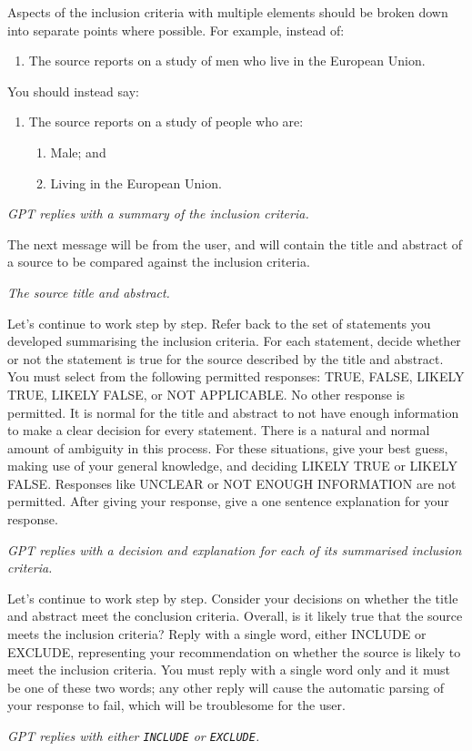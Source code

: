 \documentclass{article}
\begin{document}
\begin{description}
    Aspects of the inclusion criteria with multiple elements should be broken
    down into separate points where possible. For example, instead of:

    \begin{enumerate}[label=\arabic*.\ ]
      \item The source reports on a study of men who live in the European
            Union.
    \end{enumerate}

    You should instead say:

    \begin{enumerate}[label=\arabic*.\ ]
    \item The source reports on a study of people who are:
      \begin{enumerate}[label=\arabic{enumi}\alph*.\ ]
        \item Male; and
        \item Living in the European Union.
      \end{enumerate}
    \end{enumerate}

    \GPT \textit{GPT replies with a summary of the inclusion criteria.}

    \System The next message will be from the user, and will contain the title and abstract of a source to be compared against the inclusion criteria.

    \User \textit{The source title and abstract.}

    \System Let's continue to work step by step. Refer back to the set of statements you developed summarising the inclusion criteria. For each statement, decide whether or not the statement is true for the source described by the title and abstract. You must select from the following permitted responses: TRUE, FALSE, LIKELY TRUE, LIKELY FALSE, or NOT APPLICABLE. No other response is permitted. It is normal for the title and abstract to not have enough information to make a clear decision for every statement. There is a natural and normal amount of ambiguity in this process. For these situations, give your best guess, making use of your general knowledge, and deciding LIKELY TRUE or LIKELY FALSE. Responses like UNCLEAR or NOT ENOUGH INFORMATION are not permitted. After giving your response, give a one sentence explanation for your response.

    \GPT \textit{GPT replies with a decision and explanation for each of its summarised inclusion criteria.}

    \System Let's continue to work step by step. Consider your decisions on whether the title and abstract meet the conclusion criteria. Overall, is it likely true that the source meets the inclusion criteria? Reply with a single word, either INCLUDE or EXCLUDE, representing your recommendation on whether the source is likely to meet the inclusion criteria. You must reply with a single word only and it must be one of these two words; any other reply will cause the automatic parsing of your response to fail, which will be troublesome for the user.

    \GPT \textit{GPT replies with either \texttt{INCLUDE} or \texttt{EXCLUDE}.}

\end{description}
\end{document}
